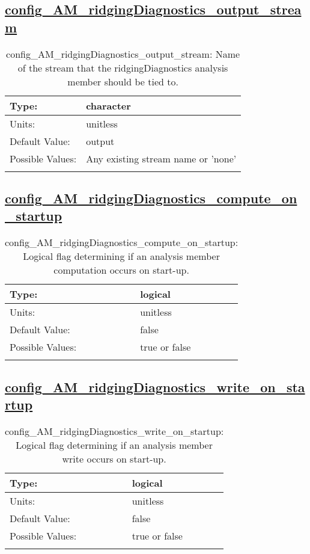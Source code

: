\subsection[config\_AM\_ridgingDiagnostics\_output\_stream]{\hyperref[sec:nm_tab_AM_ridgingDiagnostics]{config\_AM\_ridgingDiagnostics\_output\_stream}}
\label{subsec:nm_sec_config_AM_ridgingDiagnostics_output_stream}
\begin{center}
\begin{longtable}{| p{2.0in} || p{4.0in} |}
    \hline
    Type: & character \\
    \hline
    Units: & \si{unitless} \\
    \hline
    Default Value: & output \\
    \hline
    Possible Values: & Any existing stream name or 'none' \\
    \hline
    \caption{config\_AM\_ridgingDiagnostics\_output\_stream: Name of the stream that the ridgingDiagnostics analysis member should be tied to.}
\end{longtable}
\end{center}
\subsection[config\_AM\_ridgingDiagnostics\_compute\_on\_startup]{\hyperref[sec:nm_tab_AM_ridgingDiagnostics]{config\_AM\_ridgingDiagnostics\_compute\_on\_startup}}
\label{subsec:nm_sec_config_AM_ridgingDiagnostics_compute_on_startup}
\begin{center}
\begin{longtable}{| p{2.0in} || p{4.0in} |}
    \hline
    Type: & logical \\
    \hline
    Units: & \si{unitless} \\
    \hline
    Default Value: & false \\
    \hline
    Possible Values: & true or false \\
    \hline
    \caption{config\_AM\_ridgingDiagnostics\_compute\_on\_startup: Logical flag determining if an analysis member computation occurs on start-up.}
\end{longtable}
\end{center}
\subsection[config\_AM\_ridgingDiagnostics\_write\_on\_startup]{\hyperref[sec:nm_tab_AM_ridgingDiagnostics]{config\_AM\_ridgingDiagnostics\_write\_on\_startup}}
\label{subsec:nm_sec_config_AM_ridgingDiagnostics_write_on_startup}
\begin{center}
\begin{longtable}{| p{2.0in} || p{4.0in} |}
    \hline
    Type: & logical \\
    \hline
    Units: & \si{unitless} \\
    \hline
    Default Value: & false \\
    \hline
    Possible Values: & true or false \\
    \hline
    \caption{config\_AM\_ridgingDiagnostics\_write\_on\_startup: Logical flag determining if an analysis member write occurs on start-up.}
\end{longtable}
\end{center}
